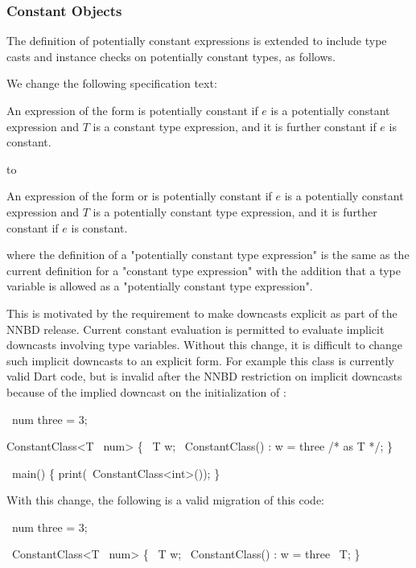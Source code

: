 \documentclass[makeidx]{article}
\begin{document}
{\subsubsection{Constant Objects}

The definition of potentially constant expressions is extended to include type
casts and instance checks on potentially constant types, as follows.

We change the following specification text:

An expression of the form  is potentially constant
if $e$ is a potentially constant expression
and $T$ is a constant type expression,
and it is further constant if $e$ is constant.
\EndCase

to

An expression of the form  or
 is potentially constant
if $e$ is a potentially constant expression
and $T$ is a potentially constant type expression,
and it is further constant if $e$ is constant.
\EndCase

where the definition of a "potentially constant type expression" is the same as
the current definition for a "constant type expression" with the addition that a
type variable is allowed as a "potentially constant type expression".

This is motivated by the requirement to make downcasts explicit as part of the
NNBD release.  Current constant evaluation is permitted to evaluate implicit
downcasts involving type variables.  Without this change, it is difficult to
change such implicit downcasts to an explicit form.  For example this class is
currently valid Dart code, but is invalid after the NNBD restriction on implicit
downcasts because of the implied downcast on the initialization of :


\begin{dartCode}
\CONST\ num three = 3;

\CLASS{} ConstantClass<T \EXTENDS\ num> \{
  \FINAL\ T w;
  \CONST\ ConstantClass() : w = three /* as T */;
\}

\VOID\ main() \{
  print(\CONST\ ConstantClass<int>());
\}
\end{dartCode}

With this change, the following is a valid migration of this code:

\begin{dartCode}
\CONST\ num three = 3;

\CLASS\ ConstantClass<T \EXTENDS\ num> \{
  \FINAL\ T w;
  \CONST\ ConstantClass() : w = three \AS\ T;
\}


\end{dartCode}}
\end{document}
